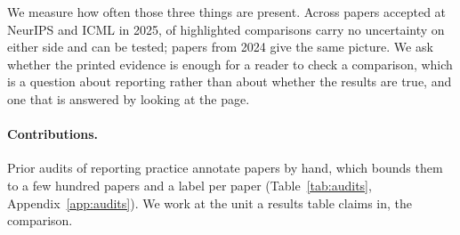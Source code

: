 \documentclass{article}
\begin{document}
We measure how often those three things are present. Across
\nPapersTwentyFive{} papers accepted at NeurIPS and ICML in 2025,
\nPctNeitherSide{} of highlighted comparisons carry no uncertainty on either
side and \nPctTestable{} can be tested; \nPapersTwentyFour{} papers from 2024
give the same picture. We ask whether the printed evidence is enough for a
reader to check a comparison, which is a question about reporting rather than
about whether the results are true, and one that is answered by looking at the
page.

\paragraph{Contributions.} Prior audits of reporting practice annotate papers by
hand, which bounds them to a few hundred papers and a label per paper
(Table~\ref{tab:audits}, Appendix~\ref{app:audits}). We work at the unit a
results table claims in, the comparison.
\end{document}
